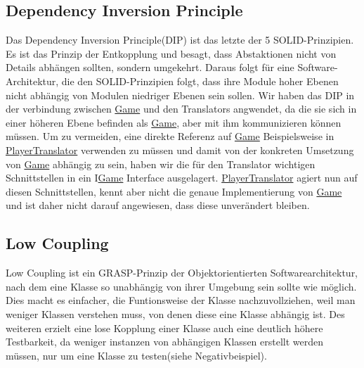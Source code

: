 \documentclass[
10pt, %
a4paper, %
oneside, %
headinclude,footinclude, %
BCOR5mm, %
]{scrartcl}
\begin{document}
\begin{onehalfspace}
\subsection{Dependency Inversion Principle}
\label{sec:depin}
Das Dependency Inversion Principle(DIP) ist das letzte der 5 SOLID-Prinzipien. Es ist das Prinzip der Entkopplung und besagt, dass Abstaktionen nicht von Details abhängen sollten, sondern umgekehrt. Daraus folgt für eine Software-Architektur, die den SOLID-Prinzipien folgt, dass ihre Module hoher Ebenen nicht abhängig von Modulen niedriger Ebenen sein sollen.
Wir haben das DIP in der verbindung zwischen \href{https://github.com/schmida736/Chess-AdvancedSE/blob/main/Chess-AdvancedSE/Game\%20Elements/Game.cs}{Game} und den Translators angwendet, da die sie sich in einer höheren Ebene befinden als \href{https://github.com/schmida736/Chess-AdvancedSE/blob/main/Chess-AdvancedSE/Game\%20Elements/Game.cs}{Game}, aber mit ihm kommunizieren können müssen.
Um zu vermeiden, eine direkte Referenz auf \href{https://github.com/schmida736/Chess-AdvancedSE/blob/main/Chess-AdvancedSE/Game\%20Elements/Game.cs}{Game} Beispielsweise in \href{https://github.com/schmida736/Chess-AdvancedSE/blob/main/Chess-AdvancedSE/Translators/PlayerTranslator.cs}{PlayerTranslator} verwenden zu müssen und damit von der konkreten Umsetzung von \href{https://github.com/schmida736/Chess-AdvancedSE/blob/main/Chess-AdvancedSE/Game\%20Elements/Game.cs}{Game} abhängig zu sein, haben wir die für den Translator wichtigen Schnittstellen in ein I\href{https://github.com/schmida736/Chess-AdvancedSE/blob/main/Chess-AdvancedSE/Game\%20Elements/Game.cs}{Game} Interface ausgelagert. \href{https://github.com/schmida736/Chess-AdvancedSE/blob/main/Chess-AdvancedSE/Translators/PlayerTranslator.cs}{PlayerTranslator} agiert nun auf diesen Schnittstellen, kennt aber nicht die genaue Implementierung von \href{https://github.com/schmida736/Chess-AdvancedSE/blob/main/Chess-AdvancedSE/Game\%20Elements/Game.cs}{Game} und ist daher nicht darauf angewiesen, dass diese unverändert bleiben.
\subsection{Low Coupling}
Low Coupling ist ein GRASP-Prinzip der Objektorientierten Softwarearchitektur, nach dem eine Klasse so unabhängig von ihrer Umgebung sein sollte wie möglich. Dies macht es einfacher, die Funtionsweise der Klasse nachzuvollziehen, weil man weniger Klassen verstehen muss, von denen diese eine Klasse abhängig ist. Des weiteren erzielt eine lose Kopplung einer Klasse auch eine deutlich höhere Testbarkeit, da weniger instanzen von abhängigen Klassen erstellt werden müssen, nur um eine Klasse zu testen(siehe Negativbeispiel).


\end{onehalfspace}
\end{document}
